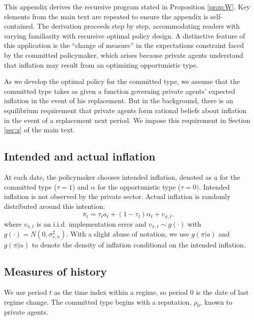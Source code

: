 \documentclass[12pt,letter,leqno]{article}
\theoremstyle{asn}
\theoremstyle{lem}
\theoremstyle{slem}
\theoremstyle{prop}
\theoremstyle{appprop}
\theoremstyle{rem}
\theoremstyle{defn}
\begin{document}
This appendix derives the recursive program stated in Proposition \ref{prop:W}. Key elements from the main text are repeated to ensure the appendix is self-contained. The derivation proceeds step by step, accommodating readers with varying familiarity with recursive optimal policy design. A distinctive feature of this application is the ``change of measure” in the expectations constraint faced by the committed policymaker, which arises because private agents  understand that inflation may result from an optimizing opportunistic type.  

As we develop the optimal policy for the committed type, we assume that the committed type takes as given a function governing private agents' expected inflation in the event of his replacement. But in the background, there is an equilibrium requirement that private agents form rational beliefs about inflation in the event of a replacement next period. We impose this requirement in Section \ref{sec:z} of the main text.

\subsection{Intended and actual inflation}
\label{appsec:recursive1}

At each date, the policymaker chooses intended inflation, denoted as $a$
for the committed type ($\tau=1$) and $\alpha $ for the opportunistic type ($%
\tau=0)$. Intended inflation is not observed by the private sector. Actual inflation is randomly distributed around this intention:
\begin{equation}\label{app:pi}
    \pi_t=\tau_t a_t + (1-\tau_t) \alpha_t + v_{\pi,t}.
\end{equation}
where $v_{\pi,t}$ is an i.i.d. implementation error and  $v_{\pi,t} \sim g(\cdot)$ with $g(\cdot) = N(0,\sigma_{v,\pi}^2)$. With a slight abuse of notation, we use $g(\pi|a)$ and $g(\pi|\alpha)$ to denote the density of inflation conditional on the intended inflation.

\subsection{Measures of history}\label{appsec:recursive2}
We use period $t$ as the time index within a regime, so period 0 is the date of last regime change. The committed type begins with a reputation, $\rho _{0}$, known to private agents. 
\end{document}
